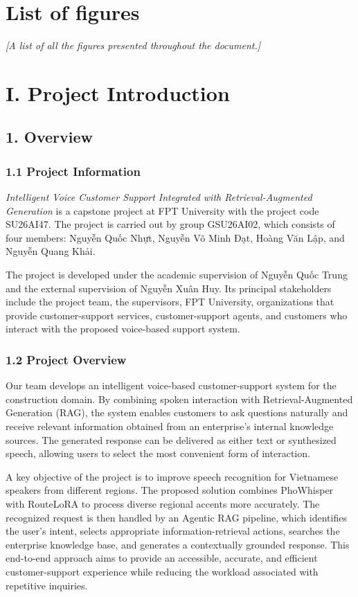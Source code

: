 \documentclass[11pt,a4paper]{article}
\makeatletter
\newcommand{\guidance}[1]{%
  {\color{guidanceblue}\itshape [#1]\par}%
}
\newcommand{\chapterstart}[1]{\clearpage\section{#1}}
\newcommand{\vietnamesetext}[1]{{\fontencoding{T5}\fontfamily{qtm}\selectfont #1}}
\newcommand{\vietnamesetext}[1]{#1}
\newcommand{\printlistoffigures}{\@starttoc{lof}}
\newcommand{\ProjectName}{Intelligent Voice Customer Support Integrated with Retrieval-Augmented Generation}
\newcommand{\GroupName}{GSU26AI02}
\newcommand{\MemberOneName}{\vietnamesetext{Nguyễn Quốc Nhựt}}
\newcommand{\MemberTwoName}{\vietnamesetext{Nguyễn Võ Minh Đạt}}
\newcommand{\MemberThreeName}{\vietnamesetext{Hoàng Văn Lập}}
\newcommand{\MemberFourName}{\vietnamesetext{Nguyễn Quang Khải}}
\newcommand{\SupervisorName}{\vietnamesetext{Nguyễn Quốc Trung}}
\newcommand{\ExternalSupervisorName}{\vietnamesetext{Nguyễn Xuân Huy}}
\newcommand{\CapstoneCode}{SU26AI47}
\makeatother
\begin{document}
\section{List of figures}
\guidance{A list of all the figures presented throughout the document.}
\printlistoffigures

\clearpage
{}
\chapterstart{I. Project Introduction}

\subsection{1. Overview}

\subsubsection{1.1 Project Information}

\textit{\ProjectName} is a capstone project at FPT University with the project
code \CapstoneCode. The project is carried out by group \GroupName, which
consists of four members: \MemberOneName, \MemberTwoName, \MemberThreeName,
and \MemberFourName.

The project is developed under the academic supervision of \SupervisorName{}
and the external supervision of \ExternalSupervisorName. Its principal
stakeholders include the project team, the supervisors, FPT University,
organizations that provide customer-support services, customer-support agents,
and customers who interact with the proposed voice-based support system.

\subsubsection{1.2 Project Overview}

Our team develops an intelligent voice-based customer-support system for the construction domain. By combining spoken interaction with Retrieval-Augmented Generation (RAG), the system enables customers to ask questions naturally and receive relevant information obtained from an enterprise's internal knowledge sources. The generated response can be delivered as either text or synthesized speech, allowing users to select the most convenient form of interaction.

A key objective of the project is to improve speech recognition for Vietnamese
speakers from different regions. The proposed solution combines PhoWhisper with
RouteLoRA to process diverse regional accents more accurately. The recognized
request is then handled by an Agentic RAG pipeline, which identifies the user's
intent, selects appropriate information-retrieval actions, searches the
enterprise knowledge base, and generates a contextually grounded response.
This end-to-end approach aims to provide an accessible, accurate, and efficient
customer-support experience while reducing the workload associated with
repetitive inquiries.
\end{document}
